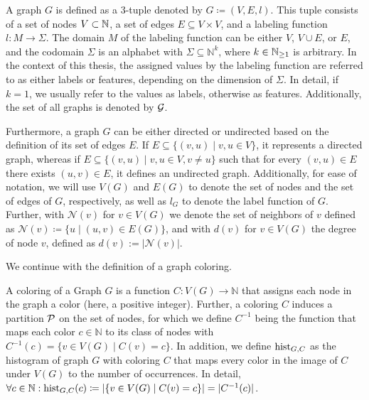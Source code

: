 \begin{definition}[Graph]
A graph $G$ is defined as a 3-tuple denoted by $G \coloneqq (V, E, l)$. This tuple consists of a set of nodes $V \subset \mathbb{N}$, a set of edges $E \subseteq V \times V$, and a labeling function $l: M \rightarrow \Sigma$. The domain $M$ of the labeling function can be either $V$, $V \cup E$, or $E$, and the codomain $\Sigma$ is an alphabet with $\Sigma \subseteq \mathbb{N}^k$, where $k \in \mathbb{N}_{\geq 1}$ is arbitrary.
In the context of this thesis, the assigned values by the labeling function are referred to as either labels or features, depending on the dimension of $\Sigma$. In detail, if $k=1$, we usually refer to the values as labels, otherwise as features. Additionally, the set of all graphs is denoted by $\mathcal{G}$.

Furthermore, a graph $G$ can be either directed or undirected based on the definition of its set of edges $E$. If $E \subseteq \{(v,u) \mid v,u \in V\}$, it represents a directed graph, whereas if $E \subseteq \{(v, u) \mid v,u \in V, v\neq u\}$ such that for every $(v,u) \in E$ there exists $(u,v) \in E$, it defines an undirected graph. Additionally, for ease of notation, we will use $V(G)$ and $E(G)$ to denote the set of nodes and the set of edges of $G$, respectively, as well as $l_G$ to denote the label function of $G$. Further, with $\mathcal{N}(v)$ for $v \in V(G)$ we denote the set of neighbors of $v$ defined as $\mathcal{N}(v) \coloneqq \{u \mid (u, v) \in E(G)\}$, and with $d(v)$ for $v \in V(G)$ the degree of node $v$, defined as $d(v) := |\mathcal{N}(v)|$.
\end{definition}

We continue with the definition of a graph coloring.

\begin{definition}
A coloring of a Graph $G$ is a function $C: V(G) \rightarrow \mathbb{N}$ that assigns each node in the graph a color (here, a positive integer). Further, a coloring $C$ induces a partition $\mathcal{P}$ on the set of nodes, for which we define $C^{-1}$ being the function that maps each color $c \in \mathbb{N}$ to its class of nodes with $C^{-1}(c) = \{ v\in V(G) \mid C(v) = c\}$. In addition, we define $\operatorname{hist}_{G, C}$ as the histogram of graph $G$ with coloring $C$ that maps every color in the image of $C$ under $V(G)$ to the number of occurrences. In detail, $\forall c \in \mathbb{N}: \operatorname{hist}_{G, C}(c) \coloneqq | \{ v \in V(G) \mid C(v) = c \} | = | C^{-1}(c) |$.
\end{definition}

